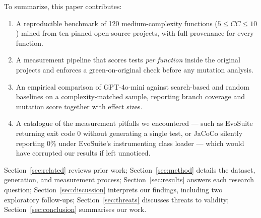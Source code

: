 To summarize, this paper contributes:
\begin{enumerate}
  \item A reproducible benchmark of 120 medium-complexity functions ($5 \le CC \le 10$) mined
    from ten pinned open-source projects, with full provenance for every function.
  \item A measurement pipeline that scores tests \emph{per function} inside the original
    projects and enforces a green-on-original check before any mutation analysis.
  \item An empirical comparison of GPT-4o-mini against search-based and random baselines on a
    complexity-matched sample, reporting branch coverage and mutation score together with
    effect sizes.
  \item A catalogue of the measurement pitfalls we encountered --- such as EvoSuite returning
    exit code 0 without generating a single test, or JaCoCo silently reporting 0\% under
    EvoSuite's instrumenting class loader --- which would have corrupted our results if left
    unnoticed.
\end{enumerate}

Section~\ref{sec:related} reviews prior work; Section~\ref{sec:method} details the
dataset, generation, and measurement process; Section~\ref{sec:results} answers each
research question; Section~\ref{sec:discussion} interprets our findings, including two
exploratory follow-ups; Section~\ref{sec:threats} discusses threats to validity;
Section~\ref{sec:conclusion} summarises our work.
